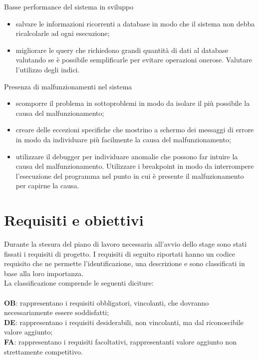 \begin{risk}{Basse performance del sistema in sviluppo}
    \begin{itemize}
        \item salvare le informazioni ricorrenti a database in modo che il sistema non debba ricalcolarle ad ogni esecuzione;
        \item migliorare le query che richiedono grandi quantità di dati al database valutando se è possibile semplificarle per evitare operazioni onerose. Valutare l'utilizzo degli indici.
    \end{itemize}
    \label{risk:basse-performance-del-sistema-in-sviluppo} 
\end{risk}
\begin{risk}{Presenza di malfunzionamenti nel sistema}
    \begin{itemize}
        \item scomporre il problema in sottoproblemi in modo da isolare il più possibile la causa del malfunzionamento;
        \item creare delle eccezioni specifiche che mostrino a schermo dei messaggi di errore in modo da individuare più facilmente la causa del malfunzionamento;
        \item utilizzare il debugger per individuare anomalie che possono far intuire la causa del malfunzionamento. Utilizzare i breakpoint in modo da interrompere l'esecuzione del 
        programma nel punto in cui è presente il malfuzionamento per capirne la causa.
    \end{itemize}
    \label{risk:presenza-di-malfunzionamenti-nel-sistema}
\end{risk}

\section{Requisiti e obiettivi}
Durante la stesura del piano di lavoro necessaria all'avvio dello stage sono stati fissati i requisiti di progetto.
I requisiti di seguito riportati hanno un codice requisito che ne permette l'identificazione, una descrizione e sono classificati in base alla loro importanza.\\
La classificazione comprende le seguenti diciture:\\\\
\textbf{OB}: rappresentano i requisiti obbligatori, vincolanti, che dovranno necessariamente essere soddisfatti;\\
\textbf{DE}: rappresentano i requisiti desiderabili, non vincolanti, ma dal riconoscibile valore aggiunto;\\
\textbf{FA}: rappresentano i requisiti facoltativi, rappresentanti valore aggiunto non strettamente competitivo.\\

